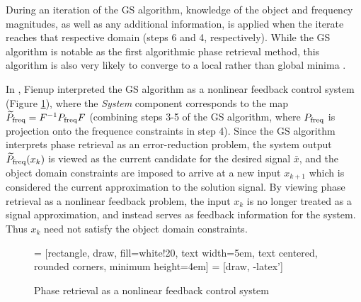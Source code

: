 During an iteration of the GS algorithm, knowledge of the object and frequency magnitudes, as well as any additional information, is applied when the iterate reaches that respective domain (steps 6 and 4, respectively).  While the GS algorithm is notable as the first algorithmic phase retrieval method, this algorithm is also very likely to converge to a local rather than global minima \cite{DBLP:journals/corr/JaganathanEH15a}.




In \cite{Fienup82},  Fienup interpreted the GS algorithm as a nonlinear feedback control system (Figure \ref{Fig:nonlinear_feedback_control_system}), where the \textit{System} component corresponds to the map $\widetilde{P}_\textnormal{freq} = F^{-1} P_\textnormal{freq} F$ (combining steps 3-5 of the GS algorithm, where $P_\textnormal{freq}$ is projection onto the frequence constraints in step 4).  Since the GS algorithm interprets phase retrieval as an error-reduction problem, the system output $\widetilde{P}_\textnormal{freq}(x_k)$ is viewed as the current candidate for the desired signal $\bar{x}$, and the object domain constraints are imposed to arrive at a new input $x_{k+1}$ which is considered the current approximation to the solution signal.  By viewing phase retrieval as a nonlinear feedback problem, the input $x_k$ is no longer treated as a signal approximation, and instead serves as feedback information for the system.  Thus $x_k$ need not satisfy the object domain constraints.

\begin{figure}[H]
\centering

 = [rectangle, draw, fill=white!20,
    text width=5em, text centered, rounded corners, minimum height=4em]
 = [draw, -latex']


\caption{Phase retrieval as a nonlinear feedback control system} \label{Fig:nonlinear_feedback_control_system}
\end{figure}


